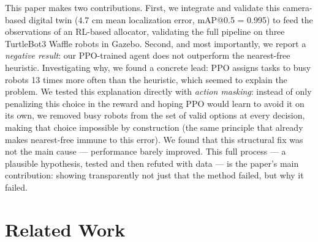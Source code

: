 \documentclass[conference]{IEEEtran}
\begin{document}
This paper makes two contributions. First, we integrate and validate this camera-based digital twin (4.7 cm mean localization error, mAP@0.5 = 0.995) to feed the observations of an RL-based allocator, validating the full pipeline on three TurtleBot3 Waffle robots in Gazebo. Second, and most importantly, we report a \emph{negative result}: our PPO-trained agent does not outperform the nearest-free heuristic. Investigating why, we found a concrete lead: PPO assigns tasks to busy robots 13 times more often than the heuristic, which seemed to explain the problem. We tested this explanation directly with \textit{action masking}: instead of only penalizing this choice in the reward and hoping PPO would learn to avoid it on its own, we removed busy robots from the set of valid options at every decision, making that choice impossible by construction (the same principle that already makes nearest-free immune to this error). We found that this structural fix was not the main cause --- performance barely improved. This full process --- a plausible hypothesis, tested and then refuted with data --- is the paper's main contribution: showing transparently not just that the method failed, but why it failed.

\section{Related Work}
\end{document}
